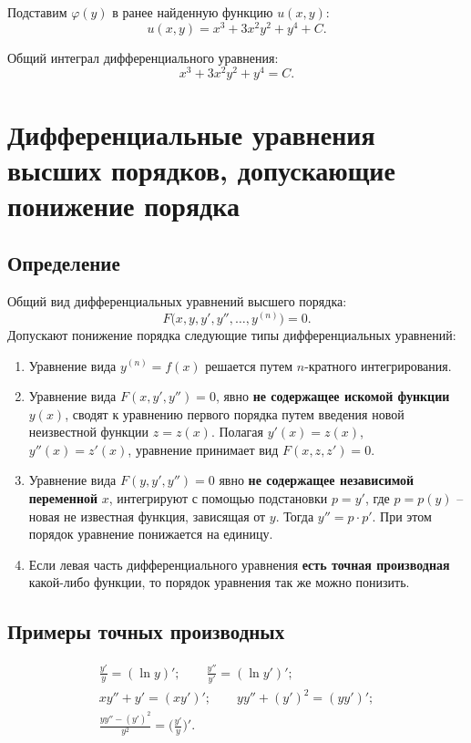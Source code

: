 \documentclass[a5paper, 11pt]{extbook}
\theoremstyle{definition}
\theoremstyle{definition}
\theoremstyle{definition}
\begin{document}
Подставим \(\varphi(y)\) в ранее найденную функцию \(u(x, y)\):
\[
    u(x, y) = x^3 + 3x^2y^2 + y^4 + C.
\]

Общий интеграл дифференциального уравнения:
\[
    x^3 + 3x^2y^2 + y^4 = C.
\]

\section{Дифференциальные уравнения высших порядков, допускающие понижение порядка}

\subsection{Определение}

Общий вид дифференциальных уравнений высшего порядка:
\[
    F \Big( x, y, y', y'', \ldots, y^{(n)} \Big) = 0.
\]
Допускают понижение порядка следующие типы дифференциальных уравнений:
\begin{enumerate}
    \item Уравнение вида \(y^{(n)} = f(x)\) решается путем \(n\)-кратного интегрирования.
    \item Уравнение вида \(F(x, y', y'') = 0\), явно \textbf{не содержащее искомой функции} \(y(x)\), сводят к уравнению первого порядка путем введения новой неизвестной функции \(z = z(x)\). Полагая \(y'(x) = z(x)\), \(y''(x) = z'(x)\), уравнение принимает вид \(F(x, z, z') = 0\).
    \item Уравнение вида \(F(y, y', y'') = 0\) явно \textbf{не содержащее независимой переменной} \(x\), интегрируют с помощью подстановки \(p = y'\), где \(p = p(y)\) -- новая не известная функция, зависящая от \(y\). Тогда \(y'' = p \cdot p'\). При этом порядок уравнение понижается на единицу.
    \item Если левая часть дифференциального уравнения \textbf{есть точная производная} какой-либо функции, то порядок уравнения так же можно понизить.
\end{enumerate}

\subsection{Примеры точных производных}

\begin{gather*}
    \frac{y'}{y} = (\ln y)';
    \qquad
    \frac{y''}{y'} = (\ln y')';
    \\
    xy'' + y' = (xy')';
    \qquad
    yy'' + (y')^2 = (yy')';
    \\
    \frac{yy'' - (y')^2}{y^2} = \Big( \frac{y'}{y} \Big)'.
\end{gather*}
\end{document}
